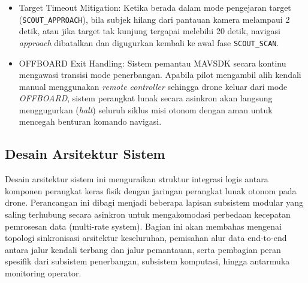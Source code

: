 \begin{itemize}
	Gambar~\ref{fig:battery_rtl_flowchart} mendeskripsikan diagram alir dari mekanisme pengamanan baterai otonom. Berdasarkan skema tersebut, dapat diperjelas kembali bahwa \textit{companion computer} Raspberry Pi 5 tidak menghitung kebutuhan energi penerbangan, konsumsi daya motor, \textit{endurance} baterai, \textit{remaining flight time}, maupun jarak spasial menuju \textit{home position}. Raspberry Pi 5 hanya memonitor nilai persentase baterai (\textit{battery percentage}) yang diperoleh dari PX4 melalui telemetri MAVSDK sebagai pemicu logika keselamatan. Ketika persentase baterai mencapai atau kurang dari 15\%, sistem otonom di Raspberry Pi 5 membatalkan misi aktif, melakukan manuver \textit{Pre-RTL Safety Climb}, dan kemudian memanggil fungsi \texttt{return\_to\_launch()} melalui MAVSDK untuk memicu prosedur pulang otomatis.
	\item Target Timeout Mitigation: Ketika berada dalam mode pengejaran target (\texttt{SCOUT\_APPROACH}), bila subjek hilang dari pantauan kamera melampaui 2 detik, atau jika target tak kunjung tergapai melebihi 20 detik, navigasi \textit{approach} dibatalkan dan digugurkan kembali ke awal fase \texttt{SCOUT\_SCAN}.
	\item OFFBOARD Exit Handling: Sistem pemantau MAVSDK secara kontinu mengawasi transisi mode penerbangan. Apabila pilot mengambil alih kendali manual menggunakan \textit{remote controller} sehingga drone keluar dari mode \textit{OFFBOARD}, sistem perangkat lunak secara asinkron akan langsung menggugurkan (\textit{halt}) seluruh siklus misi otonom dengan aman untuk mencegah benturan komando navigasi.
\end{itemize}

\subsection{Desain Arsitektur Sistem}
Desain arsitektur sistem ini menguraikan struktur integrasi logis antara komponen perangkat keras fisik dengan jaringan perangkat lunak otonom pada drone. Perancangan ini dibagi menjadi beberapa lapisan subsistem modular yang saling terhubung secara asinkron untuk mengakomodasi perbedaan kecepatan pemrosesan data (multi-rate system). Bagian ini akan membahas mengenai topologi sinkronisasi arsitektur keseluruhan, pemisahan alur data end-to-end antara jalur kendali terbang dan jalur pemantauan, serta pembagian peran spesifik dari subsistem penerbangan, subsistem komputasi, hingga antarmuka monitoring operator.
